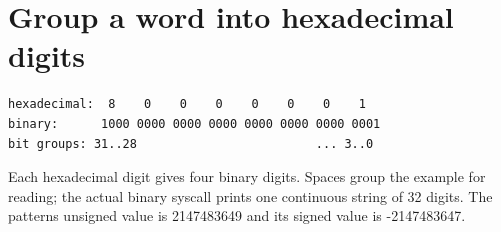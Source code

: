 \section{Group a word into hexadecimal
  digits}\label{004-bit-inspector-x-hex-groups-group-a-word-into-hexadecimal-digits}

\begin{verbatim}
hexadecimal:  8    0    0    0    0    0    0    1
binary:      1000 0000 0000 0000 0000 0000 0000 0001
bit groups: 31..28                         ... 3..0
\end{verbatim}

Each hexadecimal digit gives four binary digits. Spaces group the
example for reading; the actual binary syscall prints one continuous
string of 32 digits. The pattern\textquotesingle s unsigned value is
2147483649 and its signed value is -2147483647.
